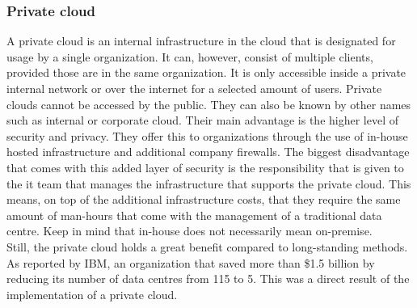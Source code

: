 \subsubsection{Private cloud}
A private cloud is an internal infrastructure in the cloud that is designated for usage by a single organization. It can, however, consist of multiple clients, provided those are in the same organization. It is only accessible inside a private internal network or over the internet for a selected amount of users. Private clouds cannot be accessed by the public. They can also be known by other names such as internal or corporate cloud. Their main advantage is the higher level of security and privacy. They offer this to organizations through the use of in-house hosted infrastructure and additional company firewalls. The biggest disadvantage that comes with this added layer of security is the responsibility that is given to the \acrshort{it} team that manages the infrastructure that supports the private cloud. This means, on top of the additional infrastructure costs, that they require the same amount of man-hours that come with the management of a traditional data centre. Keep in mind that in-house does not necessarily mean on-premise.
\\
Still, the private cloud holds a great benefit compared to long-standing methods. As reported by IBM, an organization that saved more than \$1.5 billion by reducing its number of data centres from 115 to 5. This was a direct result of the implementation of a private cloud.\autocite{Hofmann2010} 


